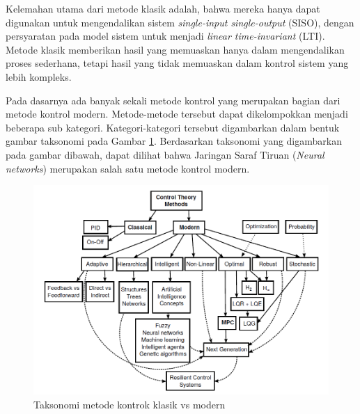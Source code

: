 Kelemahan utama dari metode klasik adalah, bahwa mereka hanya dapat digunakan untuk mengendalikan sistem \textit{single-input single-output} (SISO), dengan persyaratan pada model sistem untuk menjadi \textit{linear time-invariant} (LTI). Metode klasik memberikan hasil yang memuaskan hanya dalam mengendalikan proses sederhana, tetapi hasil yang tidak memuaskan dalam kontrol sistem yang lebih kompleks.\cite{MPCDissertation}

Pada dasarnya ada banyak sekali metode kontrol yang merupakan bagian dari metode kontrol modern. Metode-metode tersebut dapat dikelompokkan menjadi beberapa sub kategori. Kategori-kategori tersebut digambarkan dalam bentuk gambar taksonomi pada Gambar \ref{fig:3:ControlSystemTaxonomy}. Berdasarkan taksonomi yang digambarkan pada gambar dibawah, dapat dilihat bahwa Jaringan Saraf Tiruan (\textit{Neural networks}) merupakan salah satu metode kontrol modern.

\begin{figure}[!h]
	\centering
	\includegraphics[width=1\textwidth]{figures/ControlSystemTaxonomy}
	\caption{Taksonomi metode kontrok klasik vs modern \cite{NNControlBook}}
	\label{fig:3:ControlSystemTaxonomy}
\end{figure}